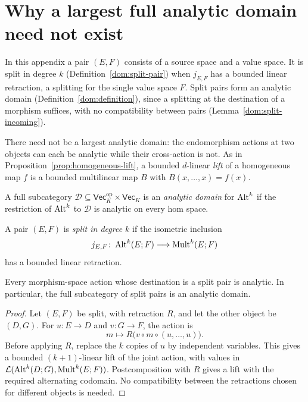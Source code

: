 \section{Why a largest full analytic domain need not exist}\label{app:no-largest}\label{dom:section}\label{sec:domains}
In this appendix a pair $(E,F)$ consists of a source space and a value space. It is split in degree $k$
(Definition~\ref{dom:split-pair}) when $j_{E,F}$ has a bounded linear retraction, a splitting for the single
value space $F$. Split pairs form an analytic domain (Definition~\ref{dom:definition}), since a splitting at
the destination of a morphism suffices, with no compatibility between pairs (Lemma~\ref{dom:split-incoming}).

There need not be a largest analytic domain: the endomorphism actions at two objects can each be
analytic while their cross-action is not.
As in Proposition~\ref{prop:homogeneous-lift}, a bounded $d$-linear \emph{lift} of a
homogeneous map $f$ is a bounded multilinear map $B$ with $B(x,\ldots,x)=f(x)$.

\begin{definition}\label{dom:definition}
A full subcategory $\mathcal D\subseteq\mathsf{Vec}_K^{\mathrm{op}}\times\mathsf{Vec}_K$ is an
\emph{analytic domain} for $\operatorname{Alt}^k$ if the restriction of $\operatorname{Alt}^k$ to $\mathcal D$ is analytic on every
hom space.
\end{definition}

\begin{definition}\label{dom:split-pair}
A pair $(E,F)$ is \emph{split in degree $k$} if the isometric inclusion
\[
j_{E,F}\colon\operatorname{Alt}^k(E;F)\longrightarrow\operatorname{Mult}^k(E;F)
\]
has a bounded linear retraction.
\end{definition}

\begin{lemma}\label{dom:split-incoming}
Every morphism-space action whose destination is a split pair is analytic. In particular, the full
subcategory of split pairs is an analytic domain.
\end{lemma}

\begin{proof}
Let $(E,F)$ be split, with retraction $R$, and let the other object be $(D,G)$. For $u\colon E\to D$
and $v\colon G\to F$, the action is
\[
m\longmapsto R\bigl(v\circ m\circ(u,\ldots,u)\bigr).
\]
Before applying $R$, replace the $k$ copies of $u$ by independent variables. This gives a bounded
$(k+1)$\nobreakdash-linear lift of the joint action, with values in
$\mathcal L(\operatorname{Alt}^k(D;G),\operatorname{Mult}^k(E;F))$. Postcomposition with $R$ gives a lift with the required alternating
codomain. No compatibility between the retractions chosen for different objects is needed.
\end{proof}

